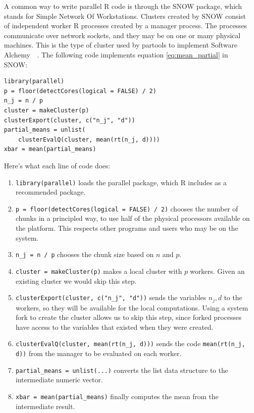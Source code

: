 \documentclass[12pt]{article}
\begin{document}
A common way to write parallel R code is through the SNOW package, which
stands for Simple Network Of Workstations.  Clusters created by SNOW
consist of independent worker R processes created by a manager process. The
processes communicate over network sockets, and they may be on one or many
physical machines.  This is the type of cluster used by partools to
implement Software Alchemy~\cite{R-partools}~\cite{matloff2014software}.
The following code implements equation \ref{eq:mean_partial} in SNOW:

\begin{verbatim}
library(parallel)
p = floor(detectCores(logical = FALSE) / 2)
n_j = n / p
cluster = makeCluster(p)
clusterExport(cluster, c("n_j", "d"))
partial_means = unlist(
    clusterEvalQ(cluster, mean(rt(n_j, d))))
xbar = mean(partial_means)
\end{verbatim}

Here's what each line of code does:

\begin{enumerate}
    \item \texttt{library(parallel)} loads the parallel package, which R
        includes as a recommended package.
    \item \texttt{p = floor(detectCores(logical = FALSE) / 2)}
        chooses the number of chunks in a principled way, to use half of
        the physical processors available on the platform. This respects
        other programs and users who may be on the system.
    \item \texttt{n\_j = n / p} chooses the chunk size based on $n$ and
        $p$. 
    \item \texttt{cluster = makeCluster(p)} makes a local cluster with $p$
        workers. Given an existing cluster we would skip this step.
    \item \texttt{clusterExport(cluster, c("n\_j", "d"))} sends the
        variables $n_j, d$ to the workers, so they will be available for
        the local computations.
        Using a system fork to create the cluster allows us to
        skip this step, since forked processes have access to the variables
        that existed when they were created.
    \item \texttt{clusterEvalQ(cluster, mean(rt(n\_j, d)))} sends the code
        \texttt{mean(rt(n\_j, d))} from the manager to be evaluated on each
        worker.
    \item \texttt{partial\_means = unlist(...)} converts the list data
        structure to the intermediate numeric vector.
    \item \texttt{xbar = mean(partial\_means)} finally computes the mean
        from the intermediate result.
\end{enumerate}
\end{document}
